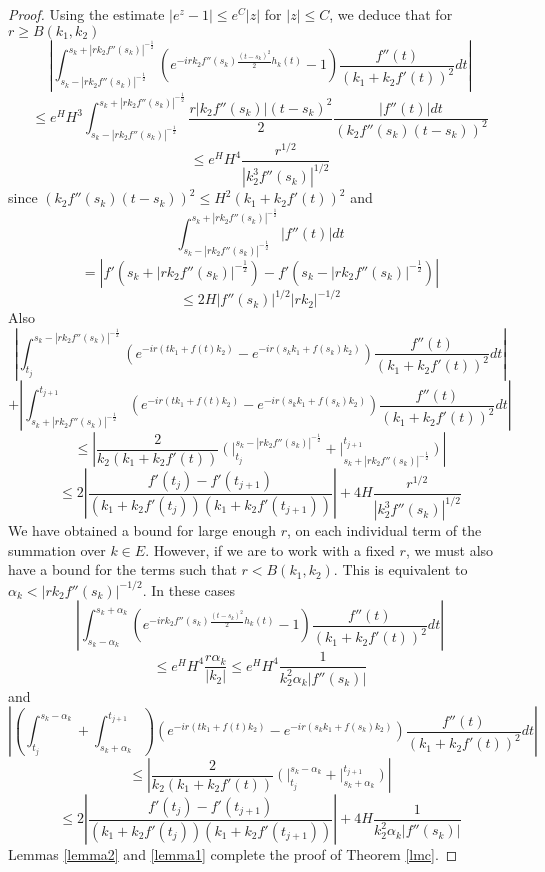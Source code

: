 \documentclass[12pt]{amsart}
\numberwithin{equation}{subsection}
\theoremstyle{definition}
\theoremstyle{plain}
\begin{document}
\begin{proof}
Using the estimate $|e^{z}-1| \leq e^C |z|$ for $|z| \leq C$, we deduce that for $r \geq B(k_1,k_2)$
\[
\left| \int_{s_k-|r k_2 f''(s_k)|^{-\frac{1}{2}}}^{s_k+|r k_2 f''(s_k)|^{-\frac{1}{2}}}
(e^{-ir k_2 f''(s_k) \frac{(t-s_k)^2}{2} h_{k}(t)}-1)\frac{f''(t)}{(k_1 + k_2 f'(t))^2}dt \right|
\]
\[
\leq e^{H}H^3 \int_{s_k-|r k_2 f''(s_k)|^{-\frac{1}{2}}}^{s_k+|r k_2 f''(s_k)|^{-\frac{1}{2}}}
\frac{r |k_2 f''(s_k)|(t-s_k)^2}{2} \frac{|f''(t)| dt}{(k_2 f''(s_k) (t - s_k))^2}
\]
\begin{equation}
\label{lmeeq1}
\leq e^H H^4  \frac{r^{1/2}}{|k_2^3 f''(s_k)|^{1/2} }
\end{equation}
since $(k_2 f''(s_k) (t - s_k))^2  \leq H^2 (k_1 + k_2 f'(t))^2$ and
\[
\int_{s_k-|r k_2 f''(s_k)|^{-\frac{1}{2}}}^{s_k+|r k_2 f''(s_k)|^{-\frac{1}{2}}} |f''(t)| dt
\]
\[
 = \left| f'(s_k + |r k_2 f''(s_k)|^{-\frac{1}{2}} ) - f'(s_k - |r k_2 f''(s_k)|^{-\frac{1}{2}} ) \right|
\]
\[
\leq 2 H |f''(s_k)|^{1/2} |r k_2|^{-1/2}
\]
Also
\[
\left| \int_{t_j}^{s_k-|r k_2 f''(s_k)|^{-\frac{1}{2}}}
 (e^{-ir(t k_1 + f(t) k_2)}-e^{-ir(s_k k_1 + f(s_k) k_2)})\frac{f''(t)}{(k_1 + k_2 f'(t))^2}dt \right|
\]
\[
+
\left|\int_{s_k+|r k_2 f''(s_k)|^{-\frac{1}{2}}}^{t_{j+1}}
 (e^{-ir(t k_1 + f(t) k_2)}-e^{-ir(s_k k_1 + f(s_k) k_2)})\frac{f''(t)}{(k_1 + k_2 f'(t))^2}dt \right|
\]
\[
\leq \left|  \frac{2}{k_2(k_1+k_2 f'(t))} \left( \left.  \right|_{t_j}^{s_k-|r k_2 f''(s_k)|^{-\frac{1}{2}}} +
\left. \right|_{s_k+|r k_2 f''(s_k)|^{-\frac{1}{2}}}^{t_{j+1}} \right) \right|
\]
\begin{equation}
\label{lmeeq2}
\leq 2 \left| \frac{f'(t_{j})-f'(t_{j+1})}{(k_1+k_2 f'(t_{j}))(k_1+k_2 f'(t_{j+1}))} \right| + 4 H \frac{r^{1/2}}{|k_2^3 f''(s_k)|^{1/2} }
\end{equation}
We have obtained a bound for large enough $r$, on each individual term of the summation over $k \in E$.
However, if we are to work with a fixed $r$, we must also have a bound for the terms such that $r < B(k_1,k_2)$.
This is equivalent to $\alpha_k < |r k_2 f''(s_k)|^{-1/2}$.
In these cases
\[
\left| \int_{s_k-\alpha_k}^{s_k+\alpha_k}
(e^{-ir k_2 f''(s_k) \frac{(t-s_k)^2}{2} h_k(t)}-1)\frac{f''(t)}{(k_1 + k_2 f'(t))^2}dt \right|
\]
\begin{equation}
\label{lmdeq1}
\leq e^{H} H^4 \frac{r \alpha_k}{|k_2|} \leq e^H H^4 \frac{1}{k_2^2 \alpha_k |f''(s_k)|}
\end{equation}
and
\[
\left|  \left( \int_{t_j}^{s_k-\alpha_k} +\int_{s_k+\alpha_k}^{t_{j+1}} \right)
(e^{-ir(t k_1 + f(t) k_2)}-e^{-ir(s_k k_1 + f(s_k) k_2)})\frac{f''(t)}{(k_1 + k_2 f'(t))^2}dt \right|
\]
\[
\leq \left| \frac{2}{k_2(k_1+k_2 f'(t))} \left( \left.  \right|_{t_j}^{s_k-\alpha_k} +
 \left. \right|_{s_k+\alpha_k}^{t_{j+1}} \right) \right|
\]
\begin{equation}
\label{lmdeq2}
\leq 2 \left| \frac{f'(t_{j})-f'(t_{j+1})}{(k_1+k_2 f'(t_{j}))(k_1+k_2 f'(t_{j+1}))} \right| + 4H\frac{1}{k_2^2 \alpha_k |f''(s_k)|}
\end{equation}
Lemmas \ref{lemma2} and \ref{lemma1} complete the proof of Theorem \ref{lmc}.
\end{proof}
\end{document}
